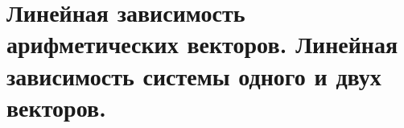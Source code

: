 \section{Линейная зависимость арифметических векторов. Линейная зависимость системы одного и двух векторов.}

\pagebreak